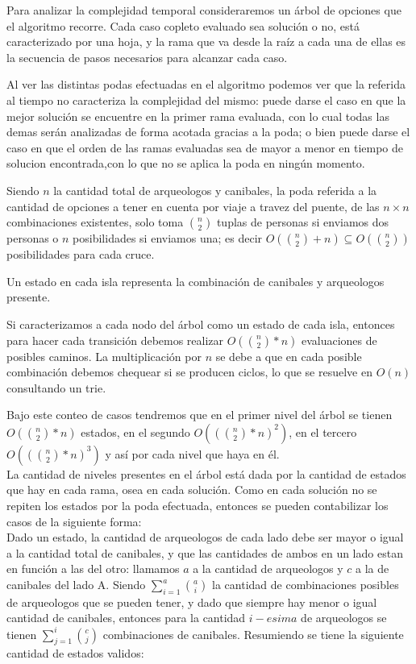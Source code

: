 
Para analizar la complejidad temporal consideraremos un árbol de opciones que el algoritmo recorre. Cada caso copleto evaluado sea solución o no, está caracterizado por una hoja, y la rama que va desde la raíz a cada una de ellas es la secuencia de pasos necesarios para alcanzar cada caso.

Al ver las distintas podas efectuadas en el algoritmo podemos ver que la referida al tiempo no caracteriza la complejidad del mismo: puede darse el caso en que la mejor solución se encuentre en la primer rama evaluada, con lo cual todas las demas serán analizadas de forma acotada gracias a la poda; o bien puede darse el caso en que el orden de las ramas evaluadas sea de mayor a menor en tiempo de solucion encontrada,con lo que no se aplica la poda en ningún momento.

Siendo $n$ la cantidad total de arqueologos y canibales, la poda referida a la cantidad de opciones a tener en cuenta por viaje a travez del puente, de las $n \times n$ combinaciones existentes, solo toma $\binom {n}{2}$ tuplas de personas si enviamos dos personas o $n$ posibilidades si enviamos una; es decir $O(\binom {n}{2} + n) \subseteq O(\binom {n}{2})$ posibilidades para cada cruce.

Un estado en cada isla representa la combinación de canibales y arqueologos presente.

Si caracterizamos a cada nodo del árbol como un estado de cada isla, entonces para hacer cada transición debemos realizar $O(\binom {n}{2} \ast n)$ evaluaciones de posibles caminos. La multiplicación por $n$ se debe a que en cada posible combinación debemos chequear si se producen ciclos, lo que se resuelve en $O(n)$ consultando un trie. 

Bajo este conteo de casos tendremos que en el primer nivel del árbol se tienen $O(\binom {n}{2} \ast n)$ estados, en el segundo $O((\binom {n}{2} \ast n)^2)$, en el tercero $O((\binom {n}{2} \ast n)^3)$ y así por cada nivel que haya en él.\\

La cantidad de niveles presentes en el árbol está dada por la cantidad de estados que hay en cada rama, osea en cada solución. Como en cada solución no se repiten los estados por la poda efectuada, entonces se pueden contabilizar los casos de la siguiente forma:\\

Dado un estado, la cantidad de arqueologos de cada lado debe ser mayor o igual a la cantidad total de canibales, y que las cantidades de ambos en un lado estan en función a las del otro: llamamos $a$ a la cantidad de arqueologos y $c$ a la de canibales del lado A. Siendo $\sum_{i=1}^{a}\binom {a}{i}$ la cantidad de combinaciones posibles de arqueologos que se pueden tener, y dado que siempre hay menor o igual cantidad de canibales, entonces para la cantidad  $i-esima$ de arqueologos se tienen $\sum_{j=1}^{i}\binom {c}{j}$ combinaciones de canibales. Resumiendo se tiene la siguiente cantidad de estados validos:

